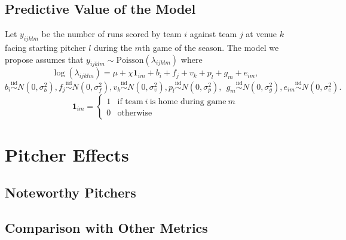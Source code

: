 \documentclass [52pt] {article}
\newcommand{\simiid}{\overset{\text{iid}}{\sim}}
\begin{document}
\subsection{Predictive Value of the Model}
Let $y_{ijklm}$ be the number of runs scored by team $i$ against team $j$ at venue $k$ facing starting pitcher $l$ during the $m$th game of the season.  The model we propose assumes that $y_{ijklm}\sim\text{Poisson}(\lambda_{ijklm})$ where
\begin{equation}\label{eq : model1}
\log(\lambda_{ijklm}) = \mu + \chi \mathbf{1}_{im} + b_i + f_j + v_k + p_l + g_m + e_{im},
\end{equation}
\[b_i\simiid N(0,\sigma^2_b), f_j\simiid N(0,\sigma^2_f), v_k\simiid N(0,\sigma^2_v), p_l\simiid N(0, \sigma^2_p),\:\:g_m\simiid N(0, \sigma^2_g), e_{im}\simiid N(0,\sigma^2_e).\]
\[\mathbf{1}_{im} = \begin{cases}
1 & \text{if team}\:i\:\text{is home during game}\:m\\
0 &\text{otherwise}
\end{cases}\]


\section{Pitcher Effects}

\subsection{Noteworthy Pitchers}

\subsection{Comparison with Other Metrics}
\end{document}
